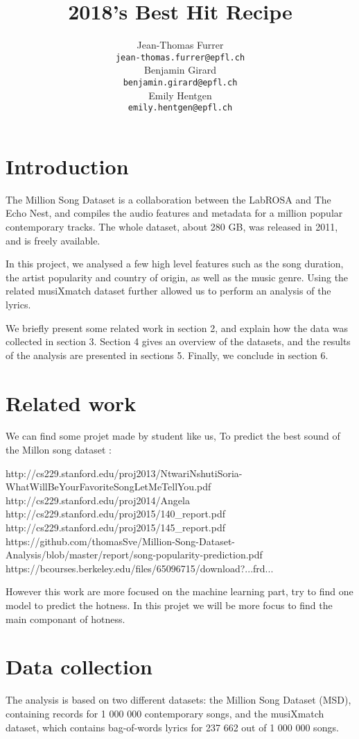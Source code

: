 \documentclass[11pt]{article}
\title{2018's Best Hit Recipe}
\author{Jean-Thomas Furrer \\
  {\small\tt jean-thomas.furrer@epfl.ch} \\\And
  Benjamin Girard \\
  {\small\tt benjamin.girard@epfl.ch} \\\And
  Emily Hentgen \\
{\small\tt emily.hentgen@epfl.ch} \\}
\date{}
\renewcommand\_{\textunderscore\allowbreak}
\begin{document}
\maketitle
\begin{abstract}
\end{abstract}


\section{Introduction}
The Million Song Dataset is a collaboration between the LabROSA and The Echo Nest, and compiles the audio features and metadata for a million popular contemporary tracks. The whole dataset, about 280 GB, was released in 2011, and is freely available. 

In this project, we analysed a few high level features such as the song duration, the artist popularity and country of origin, as well as the music genre. 
Using the related musiXmatch dataset further allowed us to perform an analysis of the lyrics.

We briefly present some related work in section 2, and explain how the data was collected in section 3. Section 4 gives an overview of the datasets, and the results of the analysis are presented in sections 5. Finally, we conclude in section 6.

\section{Related work}
We can find some projet made by student like us, To predict the best sound of the Millon song dataset : 

http://cs229.stanford.edu/proj2013/NtwariNshutiSoria-WhatWillBeYourFavoriteSongLetMeTellYou.pdf
http://cs229.stanford.edu/proj2014/Angela%
http://cs229.stanford.edu/proj2015/140_report.pdf
http://cs229.stanford.edu/proj2015/145_report.pdf
https://github.com/thomasSve/Million-Song-Dataset-Analysis/blob/master/report/song-popularity-prediction.pdf
https://bcourses.berkeley.edu/files/65096715/download?...frd...

However this work are more focused on the machine learning part, try to find one model to predict the hotness.
In this projet we will be more focus to find the main componant of hotness.

\section{Data collection}
The analysis is based on two different datasets: the Million Song Dataset (MSD), containing records for 1 000 000 contemporary songs, and the musiXmatch dataset, which contains bag-of-words lyrics for 237 662 out of 1 000 000 songs.
\end{document}
